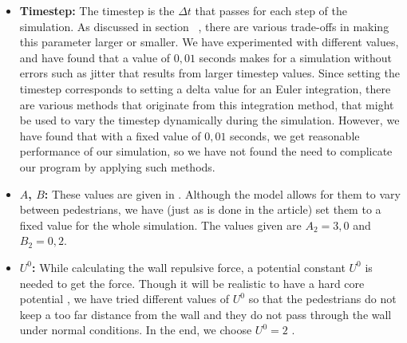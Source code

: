 \begin{itemize}
    \item \textbf{Timestep:} The timestep is the $\Delta t$ that passes for 
        each step of the simulation. As discussed in 
        section~ %
		, there are various trade-offs in making 
        this parameter larger or smaller. We have experimented with different 
        values, and have found that a value of $0,01$ seconds makes for a 
        simulation without errors such as jitter that results from larger 
        timestep values. Since setting the timestep corresponds to setting a 
        delta value for an Euler integration, there are various methods that 
        originate from this integration method, that might be used to vary the 
        timestep dynamically during the simulation. 
         However, we have found 
        that with a fixed value of $0,01$ seconds, we get reasonable 
        performance of our simulation, so we have not found the need to 
        complicate our program by applying such methods.

    \item \textbf{$A$, $B$:} These values are given in \cite{ABconstant}. 
        Although the model allows for them to vary between pedestrians, we have 
        (just as is done in the article) set them to a fixed value for the 
        whole simulation. The values given are $A_2=3,0$ and $B_2 = 0,2$.

    \item \textbf{$ U^{0} $:} While calculating the wall repulsive force, a potential
        constant $ U^{0} $ is needed to get the force. Though it will be realistic to 
        have a hard core potential \cite{self-org}, we have tried different values 
        of $ U^{0} $ so that the pedestrians do not keep a too far distance from the wall 
        and they do not pass through the wall under normal conditions. In the end, 
        we choose $ U^{0} =2 $ .
 
\end{itemize}

